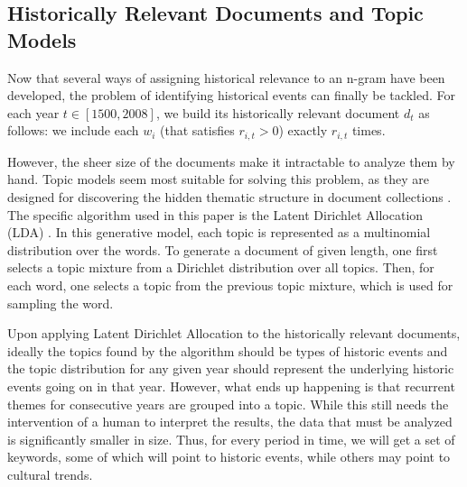 \subsection{Historically Relevant Documents and Topic Models}

Now that several ways of assigning historical relevance to an n-gram have been developed, the problem of identifying historical events can finally be tackled. For each year $t \in \left[ 1500, 2008 \right]$, we build its historically relevant document $d_t$ as follows: we include each $w_i$ (that satisfies $r_{i, t} > 0$) exactly $r_{i, t}$ times.

However, the sheer size of the documents make it intractable to analyze them by hand. Topic models seem most suitable for solving this problem, as they are designed for discovering the hidden thematic structure in document collections \cite{Blei:2012:PTM:2133806.2133826}. The specific algorithm used in this paper is the Latent Dirichlet Allocation (LDA) \cite{Blei:2003:LDA:944919.944937}. In this generative model, each topic is represented as a multinomial distribution over the words. To generate a document of given length, one first selects a topic mixture from a Dirichlet distribution over all topics. Then, for each word, one selects a topic from the previous topic mixture, which is used for sampling the word.

Upon applying Latent Dirichlet Allocation to the historically relevant documents, ideally the topics found by the algorithm should be types of historic events and the topic distribution for any given year should represent the underlying historic events going on in that year. However, what ends up happening is that recurrent themes for consecutive years are grouped into a topic. While this still needs the intervention of a human to interpret the results, the data that must be analyzed is significantly smaller in size. Thus, for every period in time, we will get a set of keywords, some of which will point to historic events, while others may point to cultural trends.
